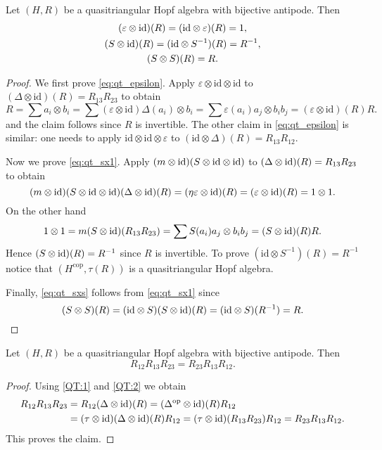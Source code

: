 \begin{proposition}
Let $(H,R)$ be a quasitriangular Hopf algebra with bijective antipode.
Then
\begin{gather}
(\varepsilon\otimes\id)(R)=(\id\otimes\varepsilon)(R)=1,\label{eq:qt_epsilon}\\
(S\otimes\id)(R)=(\id\otimes S^{-1})(R)=R^{-1},\label{eq:qt_sx1}\\
(S\otimes S)(R)=R.\label{eq:qt_sxs}
\end{gather}
\end{proposition}

\begin{proof}
We first prove \eqref{eq:qt_epsilon}. Apply $\varepsilon\otimes\textrm{id}\otimes\textrm{id}$
to $(\Delta\otimes\textrm{id})(R)=R_{13}R_{23}$ to obtain 
\[
R=\sum a_{i}\otimes b_{i}=\sum(\varepsilon\otimes\textrm{id})\Delta(a_{i})\otimes b_{i}=\sum\varepsilon(a_{i})a_{j}\otimes b_{i}b_{j}=(\varepsilon\otimes\textrm{id})(R)R.
\]
and the claim follows since $R$ is invertible. The other claim in
\eqref{eq:qt_epsilon} is similar: one needs to apply
$\textrm{id}\otimes\textrm{id}\otimes\varepsilon$ to
$(\textrm{id}\otimes\Delta)(R)=R_{13}R_{12}$.

Now we prove \eqref{eq:qt_sx1}.  Apply $(m\otimes\mathrm{id})(S\otimes\mathrm{id}\otimes\mathrm{id})$
to $(\Delta\otimes\mathrm{id})(R)=R_{13}R_{23}$ to obtain 
\[
(m\otimes\mathrm{id})(S\otimes\mathrm{id}\otimes\mathrm{id})(\Delta\otimes\mathrm{id})(R)=(\eta\varepsilon\otimes\mathrm{id})(R)=(\varepsilon\otimes\mathrm{id})(R)=1\otimes1.
\]
On the other hand 
\[
1\otimes 1=m(S\otimes\mathrm{id})(R_{13}R_{23})=\sum S(a_{i})a_{j}\otimes b_{i}b_{j}=(S\otimes\mathrm{id})(R)R.
\]
Hence $(S\otimes\mathrm{id})(R)=R^{-1}$ since $R$ is invertible.
To prove $(\textrm{id}\otimes S^{-1})(R)=R^{-1}$ notice that $(H^{\textrm{cop}},\tau(R))$
is a quasitriangular Hopf algebra.

Finally, \eqref{eq:qt_sxs} follows from \eqref{eq:qt_sx1} since
\[
(S\otimes S)(R)=(\textrm{id}\otimes S)(S\otimes\textrm{id})(R)=(\textrm{id}\otimes S)(R^{-1})=R.\qedhere
\]
\end{proof}

\begin{proposition}
\label{proposition:R-matrix}
Let $(H,R)$ be a quasitriangular Hopf algebra
with bijective antipode. Then 
\begin{equation}
R_{12}R_{13}R_{23}=R_{23}R_{13}R_{12}.\label{eq:121323=231312}
\end{equation}
\end{proposition}

\begin{proof}
Using \eqref{QT:1} and \eqref{QT:2} we obtain 
\begin{align*}
R_{12}R_{13}R_{23} & =R_{12}(\Delta\otimes\textrm{id})(R)=(\Delta^{\mathrm{op}}\otimes\mathrm{id})(R)R_{12}\\
 & =(\tau\otimes\mathrm{id})(\Delta\otimes\mathrm{id})(R)R_{12}=(\tau\otimes\mathrm{id})(R_{13}R_{23})R_{12}=R_{23}R_{13}R_{12}.
\end{align*}
This proves the claim.
\end{proof}

